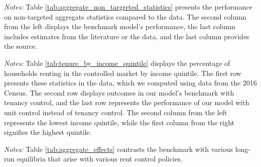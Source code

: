 \documentclass[parskip=full]{article}
\newenvironment{fignote2}[1]
{
\par
\medskip
\begin{minipage}{#1}
\footnotesize
}
{
\end{minipage}
}
\begin{document}
\begin{table}[H]
    \centering
    \caption{Aggregate non-targeted statistics}
    \vspace{-0.5cm}
    \label{tab:aggregate_non_targreted_statistics}  
    \vspace{-0.45cm}
    \begin{fignote2}{0.74\textwidth}
      \textit{Notes:} Table \ref{tab:aggregate_non_targreted_statistics} presents the performance on non-targeted aggregate statistics compared to the data. The second column from the left displays the benchmark model's performance, the last column includes estimates from the literature or the data, and the last column provides the source.
    \end{fignote2}
\end{table}

\begin{table}[H]
    \centering
    \caption{Households in controlled market by income quintile (all households)}
    \vspace{-0.5cm}
    \label{tab:tenure_by_income_quintile}    
    
    \vspace{-0.45cm}
    \begin{fignote2}{0.81\textwidth}
    \textit{Notes:} Table \ref{tab:tenure_by_income_quintile} displays the percentage of households renting in the controlled market by income quintile. The first row presents these statistics in the data, which we computed using data from the 2016 Census. The second row displays outcomes in our model's benchmark with tenancy control, and the last row represents the performance of our model with unit control instead of tenancy control. The second column from the left represents the lowest income quintile, while the first column from the right signifies the highest quintile.  
    \end{fignote2}
\end{table}

\begin{table}[H]
    \centering
    \caption{Aggregate effects generated by changes in rent-control policy}
    \vspace{-0.5cm}
    \label{tab:aggregate_effects}
    
    \vspace{-0.6cm}
    \begin{fignote2}{1.07\textwidth}
    \textit{Notes:} Table \ref{tab:aggregate_effects} contrasts the benchmark with various long-run equilibria that arise with various rent control policies.
    \end{fignote2}
\end{table}
\end{document}
